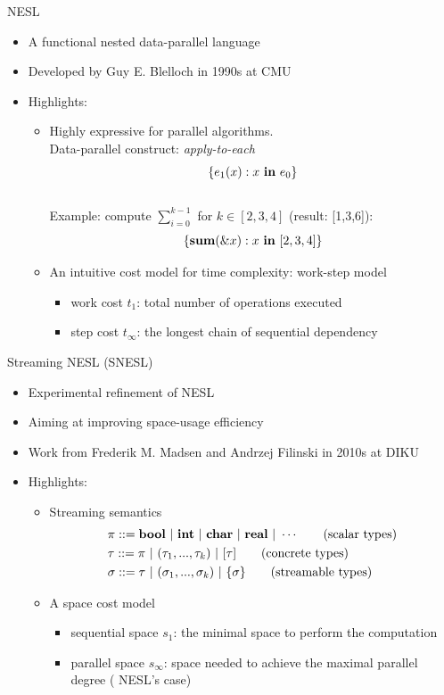 \documentclass{beamer}
\begin{document}
\begin{frame}{NESL}
	\begin{itemize}
		\item A functional nested data-parallel language
		\item Developed by Guy E. Blelloch in 1990s at CMU
		\item Highlights: 
		\begin{itemize}
			\item Highly expressive for parallel algorithms. \\ 
			Data-parallel construct: \emph{apply-to-each} $$\{e_1(x) : x \ \mathbf{in} \ e_0 \} $$\\ 
	  Example: compute $\sum_{i=0}^{k-1}$ for $k \in [2,3,4]$ (result: [1,3,6]):
	  $$\{\*{sum}(\&x) : x \ \*{in} \ [2,3,4]\} $$
	  
	  \item An intuitive cost model for time complexity: work-step model
	  \begin{itemize}
	  	\item work cost $t_1$: total number of operations executed
	  	\item step cost $t_\infty$: the longest chain of sequential dependency
	  \end{itemize}
	\end{itemize}
	\end{itemize}
  
\end{frame}

\begin{frame}{Streaming NESL (SNESL)}
	\begin{itemize}
		\item Experimental refinement of NESL
		\item Aiming at improving space-usage efficiency 
		\item Work from Frederik M. Madsen and Andrzej Filinski in 2010s at DIKU
		\item Highlights:
		\begin{itemize}
			\item Streaming semantics 
			\begin{align*} 
			& \pi ::= \bool \ | \ \int \ | \ \*{char} \ | \ \*{real}  \ | \ \cdots \tag{scalar types}\\
			& \tau ::= \pi \ | \ (\tau_1,...,\tau_k) \ | \ [\tau] \tag{concrete types} \\
			& \sigma ::= \tau \ | \ (\sigma_1,...,\sigma_k) \ | \ \tseq{\sigma}  \tag{streamable types} 
			\end{align*}
			
			\item A space cost model
			\begin{itemize}
				\item sequential space $s_1$: the minimal space to perform the computation
				\item parallel space $s_\infty$: space needed to achieve the maximal parallel degree ( NESL's case)
			\end{itemize}
		\end{itemize}
	\end{itemize}
\end{frame}
\end{document}
